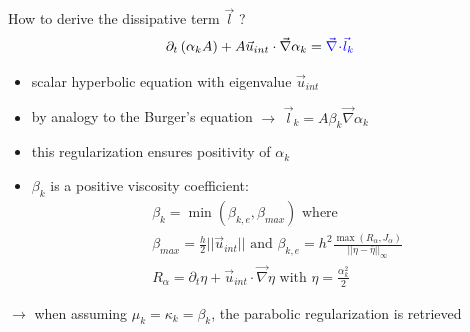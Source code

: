 \documentclass[xcolor=dvipsnames,10pt]{beamer}
\renewcommand{\div}{\vec{\nabla}\! \cdot \!}
\newcommand{\grad}{\vec{\nabla}}
\begin{document}
\begin{frame}{How to derive the dissipative term $\vec{l}$ ?}
\begin{equation}
\partial_t \left( \alpha_k  A\right) + A \vec{u}_{int} \cdot \grad \alpha_k = {\color{blue}\div \vec{l}_k} \nonumber
\end{equation}
\begin{block}{}
\begin{itemize}
\item scalar hyperbolic equation with eigenvalue $\vec{u}_{int}$
\item by analogy to the Burger's equation $\to$ $\vec{l}_k = A \beta_k \grad \alpha_k$
\item this regularization ensures positivity of $\alpha_k$
\item $\beta_k$ is a positive viscosity coefficient:
\begin{align}
&\beta_k = \min ( \beta_{k,e}, \beta_{max}) \text{ where }\nonumber \\
&\beta_{max} = \frac{h}{2} || \vec{u}_{int} || \text{ and } \beta_{k,e} = h^2 \frac{\max( R_\alpha, J_\alpha )}{|| \eta - \bar{\eta} ||_\infty} \nonumber \\
&R_\alpha = \partial_t \eta + \vec{u}_{int}\cdot \grad \eta \text{ with } \eta = \frac{\alpha_k^2}{2}  \nonumber
\end{align}
\end{itemize}
\end{block}
$\rightarrow$ when assuming $\mu_k = \kappa_k = \beta_k$, the parabolic regularization is retrieved
\end{frame}
\end{document}
